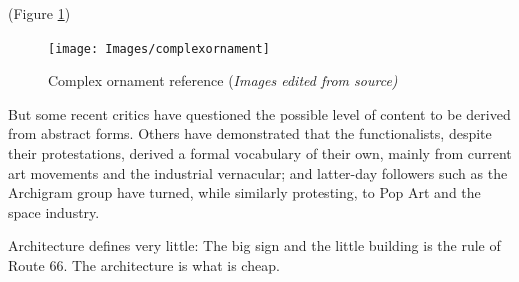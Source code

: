 
(Figure \ref{fig:complexornament})

     \begin{figure}[htb]
          \centering
          \texttt{[image: Images/complexornament]}
          \caption{Complex ornament reference  (\textit{Images edited from source)}}
          \label{fig:complexornament}
        \end{figure}








    But some recent critics  have  questioned  the possible level of content to  be derived  from  abstract forms.
    Others have  demonstrated that the functionalists,  despite  their protestations, derived  a  formal vocabulary of their own, mainly from current art movements and the industrial vernacular;
    and  latter-day  followers  such  as  the  Archigram  group  have turned,  while  similarly  protesting,  to Pop  Art and  the space  industry.\cite{Venturi1972}

    Architecture defines very little: The big sign and the little building is the rule of Route 66.
    The architecture is what is cheap.\cite{Venturi1972}


